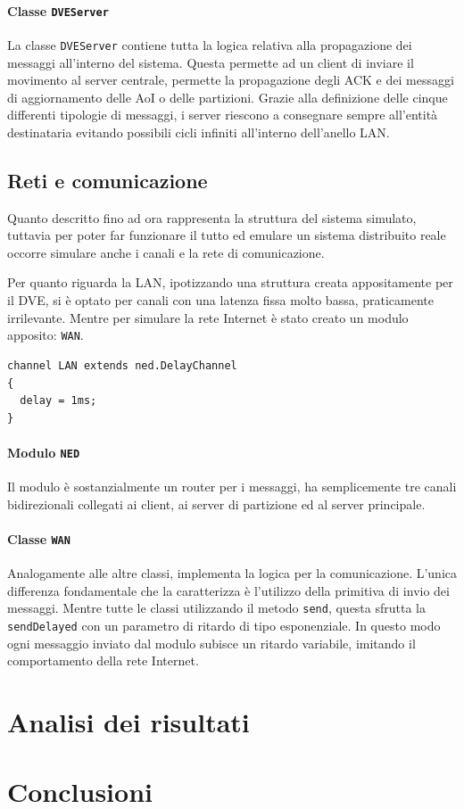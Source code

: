 \documentclass[a4paper, 11pt, oneside]{book}
\theoremstyle{definition}
\theoremstyle{remark}
\begin{document}
\subsubsection{Classe \texttt{DVEServer}}
La classe \texttt{DVEServer} contiene tutta la logica relativa alla propagazione
dei messaggi all'interno del sistema. Questa permette ad un client di inviare
il movimento al server centrale, permette la propagazione degli ACK e dei
messaggi di aggiornamento delle AoI o delle partizioni.
Grazie alla definizione delle cinque differenti tipologie di messaggi, i server
riescono a consegnare sempre all'entità destinataria evitando
possibili cicli infiniti all'interno dell'anello LAN.

\section{Reti e comunicazione}
Quanto descritto fino ad ora rappresenta la struttura del sistema simulato,
tuttavia per poter far funzionare il tutto ed emulare un sistema distribuito
reale occorre simulare anche i canali e la rete di comunicazione.

Per quanto riguarda la LAN, ipotizzando una struttura creata appositamente
per il DVE, si è optato per canali con una latenza fissa molto bassa,
praticamente irrilevante. Mentre per simulare la rete Internet è stato creato
un modulo apposito: \texttt{WAN}.
\begin{lstlisting}
channel LAN extends ned.DelayChannel
{
  delay = 1ms;
}
\end{lstlisting}

\subsubsection{Modulo \texttt{NED}}
Il modulo è sostanzialmente un router per i messaggi, ha semplicemente tre
canali bidirezionali collegati ai client, ai server di partizione ed al server
principale.
\subsubsection{Classe \texttt{WAN}}
Analogamente alle altre classi, implementa la logica per la comunicazione.
L'unica differenza fondamentale che la caratterizza è l'utilizzo della
primitiva di invio dei messaggi. Mentre tutte le classi utilizzando il metodo
\texttt{send}, questa sfrutta la \texttt{sendDelayed} con un parametro
di ritardo di tipo esponenziale. In questo modo ogni messaggio inviato dal
modulo subisce un ritardo variabile, imitando il comportamento della rete
Internet.

\chapter{Analisi dei risultati}\label{analisi}

\chapter{Conclusioni}\label{conclusioni}

\backmatter

\end{document}

